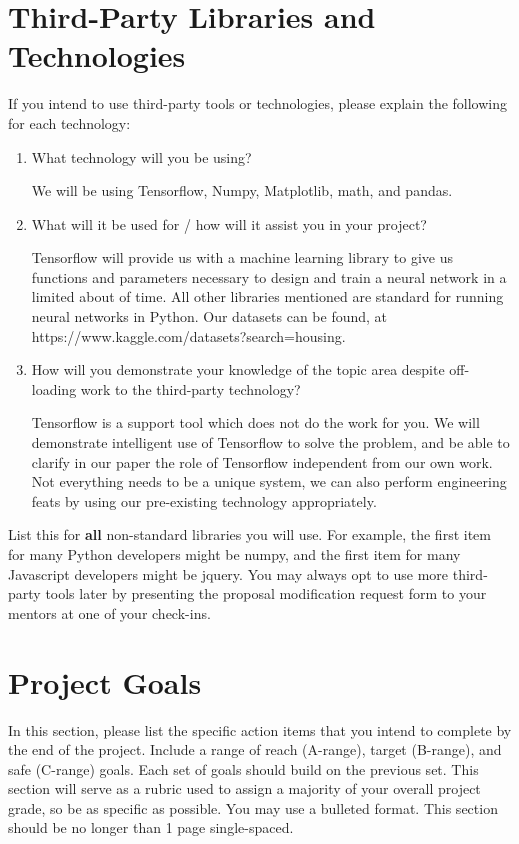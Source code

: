 \documentclass[]{article}
\begin{document}
\section{Third-Party Libraries and Technologies}

If you intend to use third-party tools or technologies, please explain the following for each technology:

\begin{enumerate}
	\item What technology will you be using?
        
        We will be using Tensorflow, Numpy, Matplotlib, math, and pandas.
        
        \item What will it be used for / how will it assist you in your project?
        
        Tensorflow will provide us with a machine learning library to give us functions and parameters necessary to design and train a neural network in a limited about of time.  All other libraries mentioned are standard for running neural networks in Python.
        Our datasets can be found, at https://www.kaggle.com/datasets?search=housing.
        
        \item How will you demonstrate your knowledge of the topic area despite off-loading work to the third-party technology?
        
        Tensorflow is a support tool which does not do the work for you.  We will demonstrate intelligent use of Tensorflow to solve the problem, and be able to clarify in our paper the role of Tensorflow independent from our own work.  Not everything needs to be a unique system, we can also perform engineering feats by using our pre-existing technology appropriately.
\end{enumerate}

List this for \textbf{all} non-standard libraries you will use. For example, the first item for many Python developers might be numpy, and the first item for many Javascript developers might be jquery. You may always opt to use more third-party tools later by presenting the proposal modification request form to your mentors at one of your check-ins.

\section{Project Goals}

In this section, please list the specific action items that you intend to complete by the end of the project. Include a range of reach (A-range), target (B-range), and safe (C-range) goals. Each set of goals should build on the previous set. This section will serve as a rubric used to assign a majority of your overall project grade, so be as specific as possible. You may use a bulleted format. This section should be no longer than 1 page single-spaced.
\end{document}
